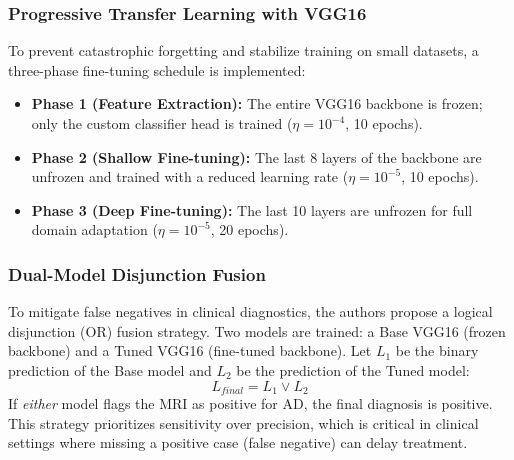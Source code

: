 \subsubsection{Progressive Transfer Learning with VGG16}
To prevent catastrophic forgetting and stabilize training on small datasets, a three-phase fine-tuning schedule is implemented:
\begin{itemize}
    \item \textbf{Phase 1 (Feature Extraction):} The entire VGG16 backbone is frozen; only the custom classifier head is trained ($\eta = 10^{-4}$, 10 epochs).
    \item \textbf{Phase 2 (Shallow Fine-tuning):} The last 8 layers of the backbone are unfrozen and trained with a reduced learning rate ($\eta = 10^{-5}$, 10 epochs).
    \item \textbf{Phase 3 (Deep Fine-tuning):} The last 10 layers are unfrozen for full domain adaptation ($\eta = 10^{-5}$, 20 epochs).
\end{itemize}

\subsubsection{Dual-Model Disjunction Fusion}
To mitigate false negatives in clinical diagnostics, the authors propose a logical disjunction (OR) fusion strategy. Two models are trained: a Base VGG16 (frozen backbone) and a Tuned VGG16 (fine-tuned backbone). Let $L_1$ be the binary prediction of the Base model and $L_2$ be the prediction of the Tuned model:
\begin{equation}
    L_{final} = L_1 \lor L_2
\end{equation}
If \textit{either} model flags the MRI as positive for AD, the final diagnosis is positive. This strategy prioritizes sensitivity over precision, which is critical in clinical settings where missing a positive case (false negative) can delay treatment.

